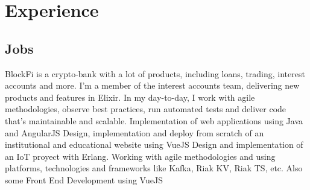 \documentclass[11pt,a4paper,sans]{moderncv/moderncv} %
\begin{document}
\makecvtitle


\section{Experience}
  \subsection{Jobs}
  { BlockFi is a crypto-bank with a lot of products, including loans, trading, interest accounts and more. I'm a member of the interest accounts team, delivering new products and features in Elixir. In my day-to-day, I work with agile methodologies, observe best practices, run automated tests and deliver code that's maintainable and scalable.
  }
  { Implementation of web applications using Java and AngularJS
  }
  {Design, implementation and deploy from scratch of an institutional and educational website using VueJS }
  {Design and implementation of an IoT proyect with Erlang. Working with agile methodologies and\newline
  {using platforms, technologies and frameworks like Kafka, Riak KV, Riak TS, etc. \newline Also some Front End Development using VueJS}
  }
\end{document}
